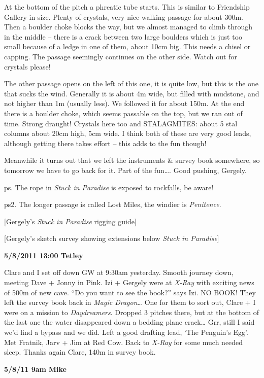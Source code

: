 At the bottom of the pitch a phreatic tube starts. This is similar to
Friendship Gallery in size. Plenty of crystals, very nice walking
passage for about 300m. Then a boulder choke blocks the way, but we
almost managed to climb through in the middle -- there is a crack
between two large boulders which is just too small because of a ledge in
one of them, about 10cm big. This needs a chisel or capping. The passage
seemingly continues on the other side. Watch out for crystals please!

The other passage opens on the left of this one, it is quite low, but
this is the one that sucks the wind. Generally it is about 4m wide, but
filled with mudstone, and not higher than 1m (usually less). We followed
it for about 150m. At the end there is a boulder choke, which seems
passable on the top, but we ran out of time. Strong draught! Crystals
here too and STALAGMITES: about 5 stal columns about 20cm high, 5cm
wide. I think both of these are very good leads, although getting there
takes effort -- this adds to the fun though!

Meanwhile it turns out that we left the instruments \& survey book
somewhere, so tomorrow we have to go back for it. Part of the
fun\ldots{}. Good pushing, Gergely.

ps. The rope in \emph{Stuck in Paradise} is exposed to rockfalls, be
aware!

ps2. The longer passage is called Lost Miles, the windier is
\emph{Penitence}.

{[}Gergely's \emph{Stuck in Paradise} rigging guide{]}

{[}Gergely's sketch survey showing extensions below \emph{Stuck in
Paradise}{]}

\textbf{5/8/2011 13:00 Tetley}

Clare and I set off down GW at 9:30am yesterday. Smooth journey down,
meeting Dave + Jonny in Pink. Izi + Gergely were at \emph{X-Ray} with
exciting news of 500m of new cave. ``Do you want to see the book?'' says
Izi. NO BOOK! They left the survey book back in \emph{Magic
Dragon}\ldots{} One for them to sort out, Clare + I were on a mission to
\emph{Daydreamers}. Dropped 3 pitches there, but at the bottom of the
last one the water disappeared down a bedding plane crack\ldots{} Grr,
still I said we'd find a bypass and we did. Left a good drafting lead,
`The Penguin's Egg'. Met Fratnik, Jarv + Jim at Red Cow. Back to
\emph{X-Ray} for some much needed sleep. Thanks again Clare, 140m in
survey book.

\textbf{5/8/11 9am} \textbf{Mike}

